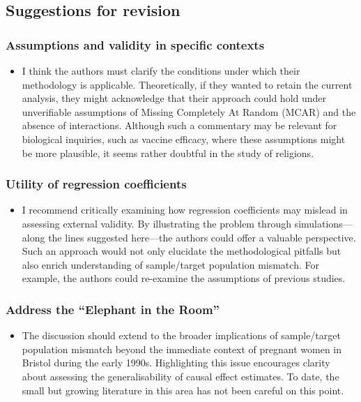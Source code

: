 \documentclass[
  singlecolumn]{article}
\providecommand{\tightlist}{%
  \setlength{\itemsep}{0pt}\setlength{\parskip}{0pt}}\usepackage{longtable,booktabs,array}
\begin{document}
\subsection{Suggestions for revision}\label{suggestions-for-revision}

\subsubsection{Assumptions and validity in specific
contexts}\label{assumptions-and-validity-in-specific-contexts}

\begin{itemize}
\tightlist
\item
  I think the authors must clarify the conditions under which their
  methodology is applicable. Theoretically, if they wanted to retain the
  current analysis, they might acknowledge that their approach could
  hold under unverifiable assumptions of Missing Completely At Random
  (MCAR) and the absence of interactions. Although such a commentary may
  be relevant for biological inquiries, such as vaccine efficacy, where
  these assumptions might be more plausible, it seems rather doubtful in
  the study of religions.
\end{itemize}

\subsubsection{Utility of regression
coefficients}\label{utility-of-regression-coefficients}

\begin{itemize}
\tightlist
\item
  I recommend critically examining how regression coefficients may
  mislead in assessing external validity. By illustrating the problem
  through simulations---along the lines suggested here---the authors
  could offer a valuable perspective. Such an approach would not only
  elucidate the methodological pitfalls but also enrich understanding of
  sample/target population mismatch. For example, the authors could
  re-examine the assumptions of previous studies.
\end{itemize}

\subsubsection{Address the ``Elephant in the
Room''}\label{address-the-elephant-in-the-room}

\begin{itemize}
\tightlist
\item
  The discussion should extend to the broader implications of
  sample/target population mismatch beyond the immediate context of
  pregnant women in Bristol during the early 1990s. Highlighting this
  issue encourages clarity about assessing the generalisability of
  causal effect estimates. To date, the small but growing literature in
  this area has not been careful on this point.
\end{itemize}
\end{document}
